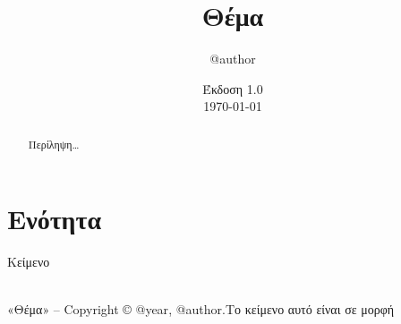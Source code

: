 \documentclass[10pt,a4paper]{article}
\makeatletter
\def\DocTitle{Θέμα}
\def\DocAuthor{@{author}}
\def\DocCopyr{@{author}}
\def\DocVersion{1.0}
\def\q#1{«#1»}							%
\def\biblio#1#2#3#4{
\bibitem{#1}
\q{\textit{#2}}, #3,\\ #4\\
}
\makeatother
\begin{document}
\setlength{\parskip}{10pt}
\setlength{\parindent}{0pt}
\rm

\author{\DocAuthor}
\title{\DocTitle}
\date{Έκδοση \DocVersion\\ \today}
\maketitle

\begin{abstract}
Περίληψη{\ldots} 	
\end{abstract}

\tableofcontents

\section{Ενότητα}
Κείμενο


\label{EOF}
\hrulefill\\
{\footnotesize
\q{\DocTitle{}} -- Copyright \copyright{} @{year}, \DocCopyr{}.\hfill{}Το κείμενο αυτό είναι σε μορφή \XeLaTeX
}
\end{document}
